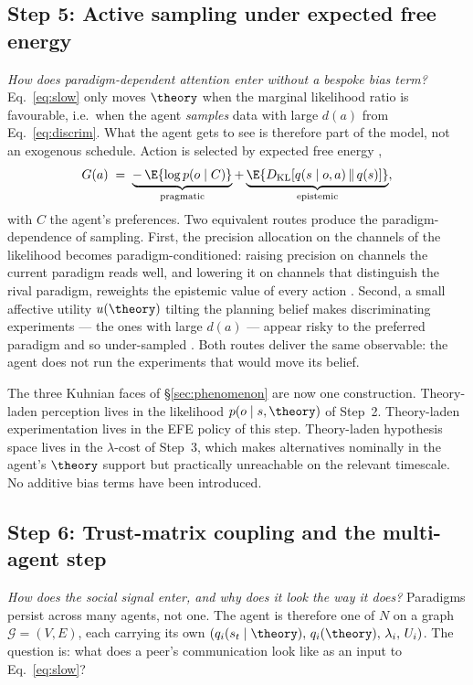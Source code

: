 \subsection{Step 5: Active sampling under expected free energy}
\label{ssec:efe}

\noindent\textit{How does paradigm-dependent attention enter without
a bespoke bias term?} Eq.~\eqref{eq:slow} only moves $\theory$ when
the marginal likelihood ratio is favourable, i.e.\ when the agent
\emph{samples} data with large $d(a)$ from Eq.~\eqref{eq:discrim}.
What the agent gets to see is therefore part of the model, not an
exogenous schedule. Action is selected by expected free energy
\citep{friston2015ActiveInferenceEpistemic,millidge2021EFE,Mirza2019_2},
\[
G(a) \;=\;
\underbrace{-\,\E{\log p(o \mid C)}}_{\text{pragmatic}}
+\underbrace{\E{D_{\mathrm{KL}}[q(s \mid o, a) \,\|\, q(s)]}}_{\text{epistemic}},
\]
with $C$ the agent's preferences. Two equivalent routes produce the
paradigm-dependence of sampling. First, the precision allocation on
the channels of the likelihood becomes paradigm-conditioned: raising
precision on channels the current paradigm reads well, and lowering
it on channels that distinguish the rival paradigm, reweights the
epistemic value of every action
\citep{feldmanFriston2010Attention,parrFriston2017Attention,
parrFriston2019AdvancedAtt,limanowskiFriston2018Dark}. Second, a
small affective utility $u(\theory)$ tilting the planning belief
makes discriminating experiments --- the ones with large $d(a)$ ---
appear risky to the preferred paradigm and so under-sampled
\citep{albarracin2022EpistemicCommunities}. Both routes deliver the
same observable: the agent does not run the experiments that would
move its belief.

The three Kuhnian faces of §\ref{sec:phenomenon} are now one
construction. Theory-laden perception lives in the likelihood
$p(o \mid s, \theory)$ of Step~2. Theory-laden experimentation lives
in the EFE policy of this step. Theory-laden hypothesis space lives
in the $\lambda$-cost of Step~3, which makes alternatives nominally
in the agent's $\theory$ support but practically unreachable on the
relevant timescale. No additive bias terms have been introduced.

\subsection{Step 6: Trust-matrix coupling and the multi-agent step}
\label{ssec:trust}

\noindent\textit{How does the social signal enter, and why does it
look the way it does?} Paradigms persist across many agents, not
one. The agent is therefore one of $N$ on a graph
$\mathcal G = (V, E)$, each carrying its own
$(q_i(s_t \mid \theory),\, q_i(\theory),\, \lambda_i,\, U_i)$. The
question is: what does a peer's communication look like as an input
to Eq.~\eqref{eq:slow}?

